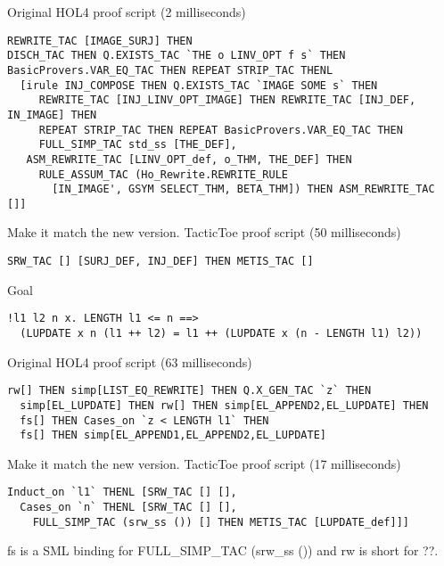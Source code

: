 \documentclass[runningheads,a4paper,draft]{svjour3}
\def\holfour{\textsf{HOL4}\xspace}
\def\sml{\textsf{SML}\xspace}
\def\tactictoe{\textsf{TacticToe}\xspace}
\begin{document}
Original \holfour proof script (2 milliseconds)
\begin{lstlisting}[language=SMLSmall]
REWRITE_TAC [IMAGE_SURJ] THEN
DISCH_TAC THEN Q.EXISTS_TAC `THE o LINV_OPT f s` THEN
BasicProvers.VAR_EQ_TAC THEN REPEAT STRIP_TAC THENL 
  [irule INJ_COMPOSE THEN Q.EXISTS_TAC `IMAGE SOME s` THEN
     REWRITE_TAC [INJ_LINV_OPT_IMAGE] THEN REWRITE_TAC [INJ_DEF, IN_IMAGE] THEN
     REPEAT STRIP_TAC THEN REPEAT BasicProvers.VAR_EQ_TAC THEN
     FULL_SIMP_TAC std_ss [THE_DEF],
   ASM_REWRITE_TAC [LINV_OPT_def, o_THM, THE_DEF] THEN
     RULE_ASSUM_TAC (Ho_Rewrite.REWRITE_RULE
       [IN_IMAGE', GSYM SELECT_THM, BETA_THM]) THEN ASM_REWRITE_TAC []]
\end{lstlisting}

\vspace{5mm}

Make it match the new version.
\tactictoe proof script (50 milliseconds)
\begin{lstlisting}[language=SMLSmall]
SRW_TAC [] [SURJ_DEF, INJ_DEF] THEN METIS_TAC []
\end{lstlisting}


Goal
\begin{lstlisting}[language=SMLSmall]
!l1 l2 n x. LENGTH l1 <= n ==> 
  (LUPDATE x n (l1 ++ l2) = l1 ++ (LUPDATE x (n - LENGTH l1) l2))
\end{lstlisting}

\vspace{5mm}

Original \holfour proof script (63 milliseconds)
\begin{lstlisting}[language=SMLSmall]
  rw[] THEN simp[LIST_EQ_REWRITE] THEN Q.X_GEN_TAC `z` THEN
  simp[EL_LUPDATE] THEN rw[] THEN simp[EL_APPEND2,EL_LUPDATE] THEN
  fs[] THEN Cases_on `z < LENGTH l1` THEN
  fs[] THEN simp[EL_APPEND1,EL_APPEND2,EL_LUPDATE]
\end{lstlisting}


\vspace{5mm}
Make it match the new version.
\tactictoe proof script (17 milliseconds)
\begin{lstlisting}[language=SMLSmall]
Induct_on `l1` THENL [SRW_TAC [] [],
  Cases_on `n` THENL [SRW_TAC [] [],
    FULL_SIMP_TAC (srw_ss ()) [] THEN METIS_TAC [LUPDATE_def]]]
\end{lstlisting}
fs is a \sml binding for FULL\_SIMP\_TAC (srw\_ss ()) and rw is short for ??.
\end{document}
